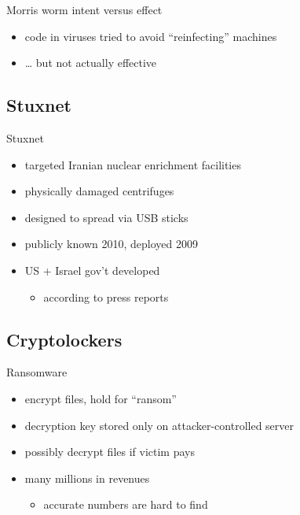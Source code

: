 \begin{frame}{Morris worm intent versus effect}
\begin{itemize}
\item code in viruses tried to avoid ``reinfecting'' machines
\item \ldots{} but not actually effective
\end{itemize}
\end{frame}

\subsection{Stuxnet}

\begin{frame}{Stuxnet}
    \begin{itemize}
        \item targeted Iranian nuclear enrichment facilities
        \item physically damaged centrifuges
        \item designed to spread via USB sticks
        \item publicly known 2010, deployed 2009
        \item US + Israel gov't developed
            \begin{itemize}
            \item according to press reports
            \end{itemize}
    \end{itemize}
\end{frame}

\subsection{Cryptolockers}

\begin{frame}{Ransomware}
    \begin{itemize}
        \item encrypt files, hold for ``ransom''
        \item decryption key stored only on attacker-controlled server
        \item possibly decrypt files if victim pays
        \vspace{.5cm}
        \item many millions in revenues 
        \begin{itemize}
            \item accurate numbers are hard to find
        \end{itemize}
    \end{itemize}
\end{frame}

